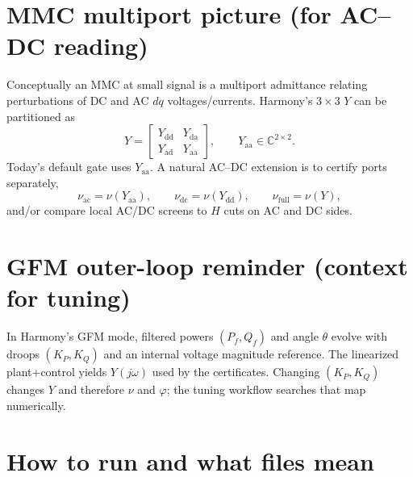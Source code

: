 \documentclass[11pt,a4paper]{article}
\theoremstyle{definition}
\begin{document}
\section{MMC multiport picture (for AC--DC reading)}

Conceptually an MMC at small signal is a multiport admittance relating
perturbations of DC and AC $dq$ voltages/currents. Harmony's $3\times 3$ $Y$
can be partitioned as
\begin{equation}
  Y
  =
  \begin{bmatrix}
    Y_{\mathrm{dd}} & Y_{\mathrm{da}} \\
    Y_{\mathrm{ad}} & Y_{\mathrm{aa}}
  \end{bmatrix},
  \qquad
  Y_{\mathrm{aa}}\in\mathbb{C}^{2\times 2}.
\end{equation}
Today's default gate uses $Y_{\mathrm{aa}}$. A natural AC--DC extension is to
certify ports separately,
\begin{equation}
  \nu_{\mathrm{ac}}=\nu(Y_{\mathrm{aa}}),\qquad
  \nu_{\mathrm{dc}}=\nu(Y_{\mathrm{dd}}),\qquad
  \nu_{\mathrm{full}}=\nu(Y),
\end{equation}
and/or compare local AC/DC screens to $H$ cuts on AC and DC sides.

\section{GFM outer-loop reminder (context for tuning)}

In Harmony's GFM mode, filtered powers $(P_f,Q_f)$ and angle $\theta$ evolve
with droops $(K_P,K_Q)$ and an internal voltage magnitude reference. The
linearized plant+control yields $Y(j\omega)$ used by the certificates.
Changing $(K_P,K_Q)$ changes $Y$ and therefore $\nu$ and $\varphi$; the
tuning workflow searches that map numerically.

\section{How to run and what files mean}
\end{document}
